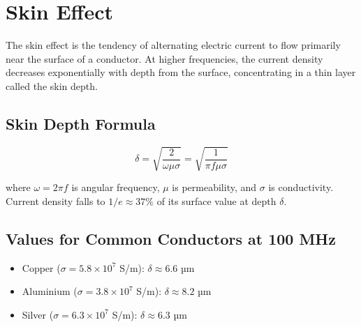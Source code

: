 \section{Skin Effect}\label{sec:wiki_skin_effect}



The skin effect is the tendency of alternating electric current to flow primarily near the surface of a conductor. At higher frequencies, the current density decreases exponentially with depth from the surface, concentrating in a thin layer called the skin depth.

				

\subsection{Skin Depth Formula}

				
\[\delta = \sqrt{\dfrac{2}{\omega\mu\sigma}} = \sqrt{\dfrac{1}{\pi f\mu\sigma}}\]

				

where $\omega = 2\pi f$ is angular frequency, $\mu$ is permeability, and $\sigma$ is conductivity. Current density falls to $1/e \approx 37\%$ of its surface value at depth $\delta$.


				

\subsection{Values for Common Conductors at 100 MHz}

				


				
\begin{itemize}

					\item Copper ($\sigma = 5.8\times10^7$ S/m): $\delta \approx 6.6$ µm

					\item Aluminium ($\sigma = 3.8\times10^7$ S/m): $\delta \approx 8.2$ µm

					\item Silver ($\sigma = 6.3\times10^7$ S/m): $\delta \approx 6.3$ µm

				
\end{itemize}

